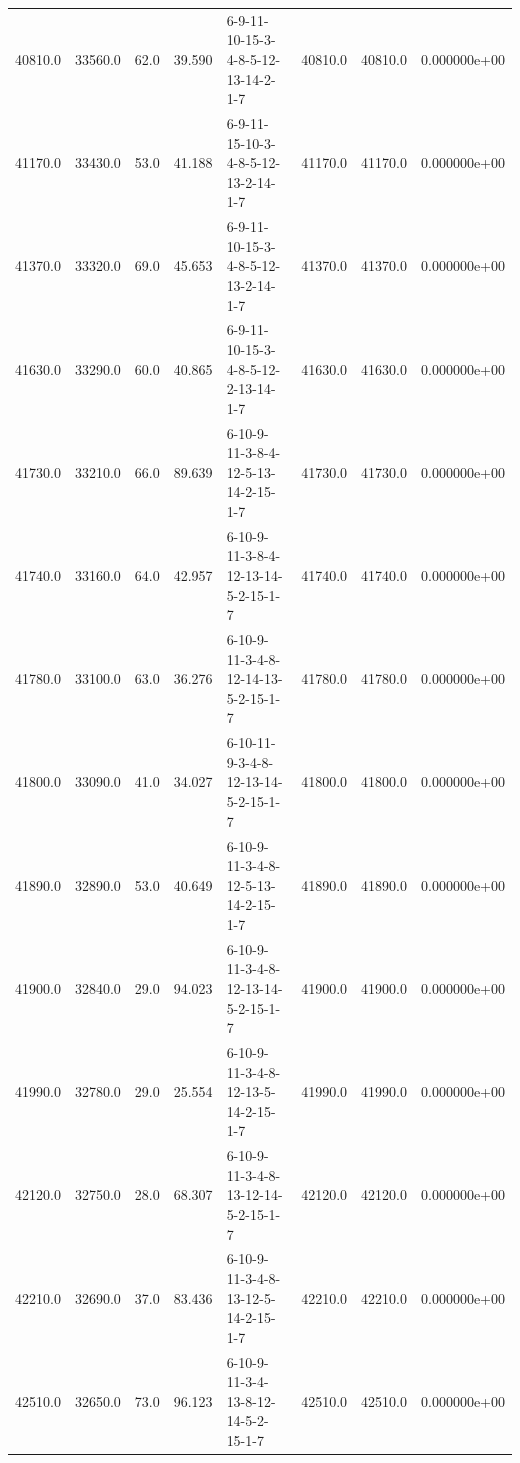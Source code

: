 \begin{tabular}{rrrrlrrr}
 40810.0 &  33560.0 &           62.0 &             39.590 &  6-9-11-10-15-3-4-8-5-12-13-14-2-1-7 &       40810.0 &         40810.0 &  0.000000e+00 \\
 41170.0 &  33430.0 &           53.0 &             41.188 &  6-9-11-15-10-3-4-8-5-12-13-2-14-1-7 &       41170.0 &         41170.0 &  0.000000e+00 \\
 41370.0 &  33320.0 &           69.0 &             45.653 &  6-9-11-10-15-3-4-8-5-12-13-2-14-1-7 &       41370.0 &         41370.0 &  0.000000e+00 \\
 41630.0 &  33290.0 &           60.0 &             40.865 &  6-9-11-10-15-3-4-8-5-12-2-13-14-1-7 &       41630.0 &         41630.0 &  0.000000e+00 \\
 41730.0 &  33210.0 &           66.0 &             89.639 &  6-10-9-11-3-8-4-12-5-13-14-2-15-1-7 &       41730.0 &         41730.0 &  0.000000e+00 \\
 41740.0 &  33160.0 &           64.0 &             42.957 &  6-10-9-11-3-8-4-12-13-14-5-2-15-1-7 &       41740.0 &         41740.0 &  0.000000e+00 \\
 41780.0 &  33100.0 &           63.0 &             36.276 &  6-10-9-11-3-4-8-12-14-13-5-2-15-1-7 &       41780.0 &         41780.0 &  0.000000e+00 \\
 41800.0 &  33090.0 &           41.0 &             34.027 &  6-10-11-9-3-4-8-12-13-14-5-2-15-1-7 &       41800.0 &         41800.0 &  0.000000e+00 \\
 41890.0 &  32890.0 &           53.0 &             40.649 &  6-10-9-11-3-4-8-12-5-13-14-2-15-1-7 &       41890.0 &         41890.0 &  0.000000e+00 \\
 41900.0 &  32840.0 &           29.0 &             94.023 &  6-10-9-11-3-4-8-12-13-14-5-2-15-1-7 &       41900.0 &         41900.0 &  0.000000e+00 \\
 41990.0 &  32780.0 &           29.0 &             25.554 &  6-10-9-11-3-4-8-12-13-5-14-2-15-1-7 &       41990.0 &         41990.0 &  0.000000e+00 \\
 42120.0 &  32750.0 &           28.0 &             68.307 &  6-10-9-11-3-4-8-13-12-14-5-2-15-1-7 &       42120.0 &         42120.0 &  0.000000e+00 \\
 42210.0 &  32690.0 &           37.0 &             83.436 &  6-10-9-11-3-4-8-13-12-5-14-2-15-1-7 &       42210.0 &         42210.0 &  0.000000e+00 \\
 42510.0 &  32650.0 &           73.0 &             96.123 &  6-10-9-11-3-4-13-8-12-14-5-2-15-1-7 &       42510.0 &         42510.0 &  0.000000e+00 \\

\end{tabular}
